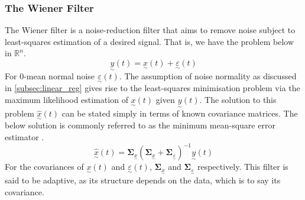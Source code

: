 \documentclass[12pt,a4paper]{article} %
\newcommand{\ve}[1]{\underset{\sim}{#1}}
\begin{document}
\subsubsection{The Wiener Filter}
\label{subsec:wiener}
The Wiener filter is a noise-reduction filter that aims to remove noise subject to least-squares estimation of a desired signal. That is, we have the problem below in $\mathbb{R}^n$.
\[
    \ve{y}(t)=\ve{x}(t)+\ve{\varepsilon}(t)
\]
For 0-mean normal noise $\ve{\varepsilon}(t)$. The assumption of noise normality as discussed in \ref{subsec:linear_reg} gives rise to the least-squares minimisation problem via the maximum likelihood estimation of $\ve{x}(t)$ given $\ve{y}(t)$. The solution to this problem $\hat{\ve{x}}(t)$ can be stated simply in terms of known covariance matrices. The below solution is commonly referred to as the minimum mean-square error estimator \cite{mmse}.
\[
    \hat{\ve{x}}(t)=\pmb{\Sigma}_{\ve{x}}(\pmb{\Sigma}_{\ve{x}}+\pmb{\Sigma}_{\ve{\varepsilon}})^{-1}\ve{y}(t)
\]
For the covariances of $\ve{x}(t)$ and $\ve{\varepsilon}(t)$, $\pmb{\Sigma}_{\ve{x}}$ and $\pmb{\Sigma}_{\ve{\varepsilon}}$ respectively. This filter is said to be adaptive, as its structure depends on the data, which is to say its covariance.
\end{document}
